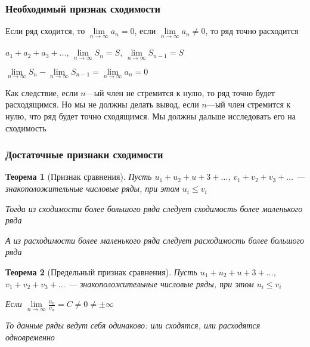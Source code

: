 \documentclass{article}
\newtheorem{theorem}{Теорема}
\begin{document}
\subsubsection{Необходимый признак сходимости}

Если ряд сходится, то $\lim\limits_{n \to \infty} a_{n} = 0$, если $\lim\limits_{n \to \infty} a_n \ne 0$, то ряд точно расходится

\hfill

$a_1 + a_2 + a_3 + \dots$, $\lim\limits_{n \to \infty} S_n = S$, $\lim\limits_{n \to \infty} S_{n - 1} = S$

$\lim\limits_{n \to \infty} S_{n} - \lim\limits_{n \to \infty} S_{n - 1} = \lim\limits_{n \to \infty} a_n = 0$

\hfill

Как следствие, если $n$—ый член не стремится к нулю, то ряд точно будет расходящимся. Но мы не должны делать вывод, если $n$—ый член стремится к нулю, что ряд будет точно сходящимся. Мы должны дальше исследовать его на сходимость

\subsubsection{Достаточные признаки сходимости}

\begin{theorem}[Признак сравнения]
    Пусть $u_1 + u_2 + u+3 + \dots$, $v_1 + v_2 + v_3 + \dots$ — знакоположительные числовые ряды, при этом $u_{i} \le v_{i}$

    Тогда из сходимости более большого ряда следует сходимость более маленького ряда

    А из расходимости более маленького ряда следует расходимость более большого ряда
\end{theorem}

\begin{theorem}[Предельный признак сравнения]
    Пусть $u_1 + u_2 + u+3 + \dots$, $v_1 + v_2 + v_3 + \dots$ — знакоположительные числовые ряды, при этом $u_{i} \le v_{i}$

    Если $\lim\limits_{n \to \infty} \frac{u_{n}}{v_{n}} = C \ne 0 \ne \pm \infty$

    То данные ряды ведут себя одинаково: или сходятся, или расходятся одновременно
\end{theorem}
\end{document}
